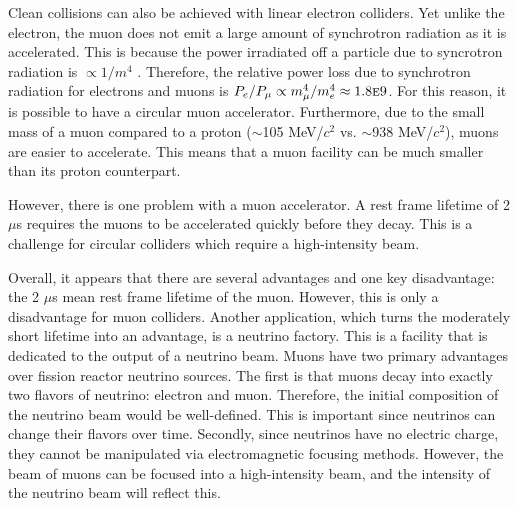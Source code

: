 Clean collisions can also be achieved with linear electron colliders. Yet unlike the electron, the muon does not emit a large amount of synchrotron radiation as it is accelerated. This is because the power irradiated off a particle due to syncrotron radiation is $\propto 1/m^4$ \cite{griffithsem}. Therefore, the relative power loss due to synchrotron radiation for electrons and muons is $P_e/P_\mu\propto m_\mu ^4/m_e ^4 \approx 1.8 \text{\sc{e}}9$. For this reason, it is possible to have a circular muon accelerator. Furthermore, due to the small mass of a muon compared to a proton ($\sim$105 MeV/$c^2$ vs. $\sim$938 MeV/$c^2$), muons are easier to accelerate. This means that a muon facility can be much smaller than its proton counterpart. 

However, there is one problem with a muon accelerator. A rest frame lifetime of 2 $\mu$s requires the muons to be accelerated quickly before they decay. This is a challenge for circular colliders which require a high-intensity beam.

Overall, it appears that there are several advantages and one key disadvantage: the 2 $\mu$s mean rest frame lifetime of the muon. However, this is only a disadvantage for muon colliders. Another application, which turns the moderately short lifetime into an advantage, is a neutrino factory. This is a facility that is dedicated to the output of a neutrino beam. Muons have two primary advantages over fission reactor neutrino sources. The first is that muons decay into exactly two flavors of neutrino: electron and muon. Therefore, the initial composition of the neutrino beam would be well-defined. This is important since neutrinos can change their flavors over time. Secondly, since neutrinos have no electric charge, they cannot be manipulated via electromagnetic focusing methods. However, the beam of muons can be focused into a high-intensity beam, and the intensity of the neutrino beam will reflect this.


